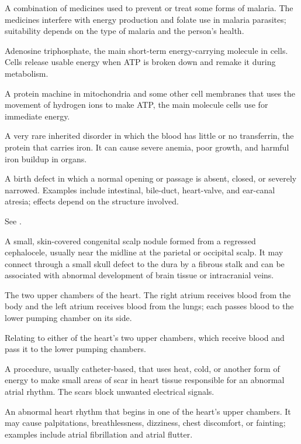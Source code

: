  A combination of medicines used to prevent or treat some forms of malaria. The medicines interfere with energy production and folate use in malaria parasites; suitability depends on the type of malaria and the person’s health.

 Adenosine triphosphate, the main short-term energy-carrying molecule in cells. Cells release usable energy when ATP is broken down and remake it during metabolism.

 A protein machine in mitochondria and some other cell membranes that uses the movement of hydrogen ions to make ATP, the main molecule cells use for immediate energy.

 A very rare inherited disorder in which the blood has little or no transferrin, the protein that carries iron. It can cause severe anemia, poor growth, and harmful iron buildup in organs.

 A birth defect in which a normal opening or passage is absent, closed, or severely narrowed. Examples include intestinal, bile-duct, heart-valve, and ear-canal atresia; effects depend on the structure involved.

 See .

 A small, skin-covered congenital scalp nodule formed from a regressed cephalocele, usually near the midline at the parietal or occipital scalp. It may connect through a small skull defect to the dura by a fibrous stalk and can be associated with abnormal development of brain tissue or intracranial veins.

 The two upper chambers of the heart. The right atrium receives blood from the body and the left atrium receives blood from the lungs; each passes blood to the lower pumping chamber on its side.

 Relating to either of the heart’s two upper chambers, which receive blood and pass it to the lower pumping chambers.

 A procedure, usually catheter-based, that uses heat, cold, or another form of energy to make small areas of scar in heart tissue responsible for an abnormal atrial rhythm. The scars block unwanted electrical signals.

 An abnormal heart rhythm that begins in one of the heart’s upper chambers. It may cause palpitations, breathlessness, dizziness, chest discomfort, or fainting; examples include atrial fibrillation and atrial flutter.

